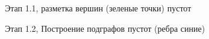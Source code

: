 \documentclass[a4paper, 14pt]{article}
\begin{document}
	
	\begin{figure}[h]
		\caption{Этап 1.1, разметка вершин (зеленые точки) пустот }
		\label{ris:image}
	\end{figure}

	\begin{figure}[h]
	\caption{Этап 1.2, Построение подграфов пустот (ребра синие) }
	\label{ris:image}
	\end{figure}
\end{document}
